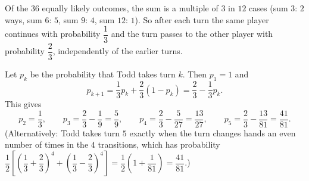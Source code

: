 Of the $36$ equally likely outcomes, the sum is a multiple of $3$ in $12$ cases (sum $3$: $2$ ways, sum $6$: $5$, sum $9$: $4$, sum $12$: $1$). So after each turn the same player continues with probability $\dfrac13$ and the turn passes to the other player with probability $\dfrac23$, independently of the earlier turns.

Let $p_k$ be the probability that Todd takes turn $k$. Then $p_1=1$ and
\[p_{k+1}=\dfrac13p_k+\dfrac23(1-p_k)=\dfrac23-\dfrac13p_k .\]
This gives
\[p_2=\dfrac13,\qquad p_3=\dfrac23-\dfrac19=\dfrac59,\qquad p_4=\dfrac23-\dfrac{5}{27}=\dfrac{13}{27},\qquad p_5=\dfrac23-\dfrac{13}{81}=\boxed{\dfrac{41}{81}}.\]
(Alternatively: Todd takes turn $5$ exactly when the turn changes hands an even number of times in the $4$ transitions, which has probability $\dfrac12\left[\left(\dfrac13+\dfrac23\right)^4+\left(\dfrac13-\dfrac23\right)^4\right]=\dfrac12\left(1+\dfrac{1}{81}\right)=\dfrac{41}{81}$.)
